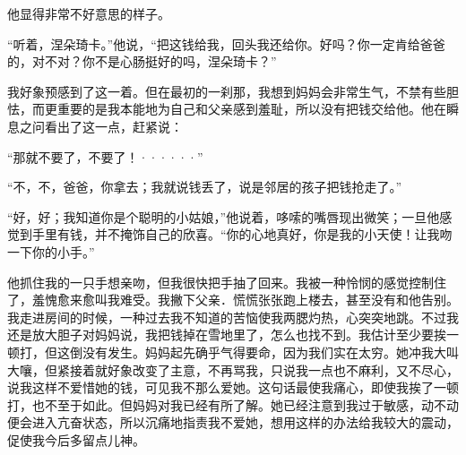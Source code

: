 \documentclass[12pt, UTF8]{ctexbook}
\begin{document}
\par 他显得非常不好意思的样子。
\par “听着，涅朵琦卡。”他说，“把这钱给我，回头我还给你。好吗？你一定肯给爸爸的，对不对？你不是心肠挺好的吗，涅朵琦卡？”
\par 我好象预感到了这一着。但在最初的一刹那，我想到妈妈会非常生气，不禁有些胆怯，而更重要的是我本能地为自己和父亲感到羞耻，所以没有把钱交给他。他在瞬息之问看出了这一点，赶紧说：
\par “那就不要了，不要了！······”
\par “不，不，爸爸，你拿去；我就说钱丢了，说是邻居的孩子把钱抢走了。”
\par “好，好；我知道你是个聪明的小姑娘，”他说着，哆嗦的嘴唇现出微笑；一旦他感觉到手里有钱，并不掩饰自己的欣喜。“你的心地真好，你是我的小天使！让我吻一下你的小手。”
\par 他抓住我的一只手想亲吻，但我很快把手抽了回来。我被一种怜悯的感觉控制住了，羞愧愈来愈叫我难受。我撇下父亲．慌慌张张跑上楼去，甚至没有和他告别。我走进房间的时候，一种过去我不知道的苦恼使我两腮灼热，心突突地跳。不过我还是放大胆子对妈妈说，我把钱掉在雪地里了，怎么也找不到。我估计至少要挨一顿打，但这倒没有发生。妈妈起先确乎气得要命，因为我们实在太穷。她冲我大叫大嚷，但紧接着就好象改变了主意，不再骂我，只说我一点也不麻利，又不尽心，说我这样不爱惜她的钱，可见我不那么爱她。这句话最使我痛心，即使我挨了一顿打，也不至于如此。但妈妈对我已经有所了解。她已经注意到我过于敏感，动不动便会进入亢奋状态，所以沉痛地指责我不爱她，想用这样的办法给我较大的震动，促使我今后多留点儿神。
\end{document}
